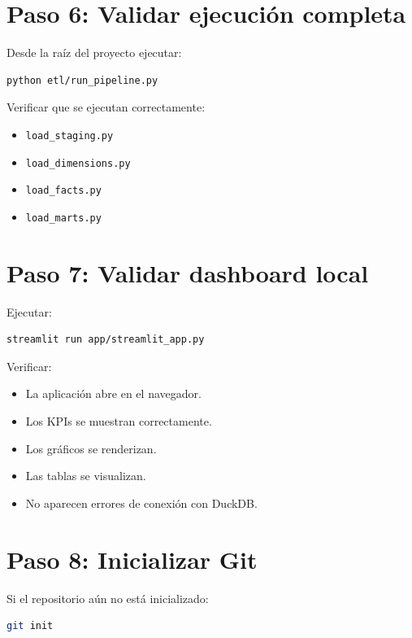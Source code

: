 \section{Paso 6: Validar ejecución completa}

Desde la raíz del proyecto ejecutar:

\begin{lstlisting}[language=bash]
python etl/run_pipeline.py
\end{lstlisting}

Verificar que se ejecutan correctamente:

\begin{itemize}
\item \texttt{load_staging.py}
\item \texttt{load_dimensions.py}
\item \texttt{load_facts.py}
\item \texttt{load_marts.py}
\end{itemize}

\section{Paso 7: Validar dashboard local}

Ejecutar:

\begin{lstlisting}[language=bash]
streamlit run app/streamlit_app.py
\end{lstlisting}

Verificar:

\begin{itemize}
\item La aplicación abre en el navegador.
\item Los KPIs se muestran correctamente.
\item Los gráficos se renderizan.
\item Las tablas se visualizan.
\item No aparecen errores de conexión con DuckDB.
\end{itemize}

\section{Paso 8: Inicializar Git}

Si el repositorio aún no está inicializado:

\begin{lstlisting}[language=bash]
git init
\end{lstlisting}

